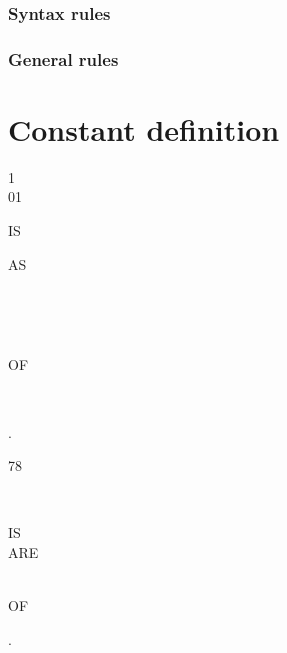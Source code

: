 \subsubsection{Syntax rules}

\subsubsection{General rules}

\section{Constant definition}

\begin{syntax}
  \begin{1=}
    1 \\
    01
  \end{1=}
  \identifier {}
  \begin{0-1}
    IS 
  \end{0-1}
  \begin{1=}
    AS
    \begin{1=}
      \literal \\
      \begin{1=}
         \\
      \end{1=}
      OF \identifier
    \end{1=} \\

     \identifier
  \end{1=}.
\end{syntax}

\begin{syntax}[\miscextcolour]
  78 \identifier
  \begin{1=}
     \\
  \end{1=}
  \begin{0-1}
    IS \\
    ARE
  \end{0-1}
  \begin{1=}
    \literal \\
     OF \identifier \\
  \end{1=}
  .
\end{syntax}

